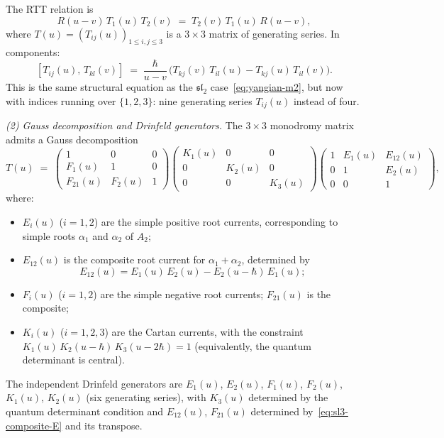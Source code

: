 \begin{example}
The RTT relation is
\begin{equation}\label{eq:sl3-rtt}
R(u{-}v)\,T_1(u)\,T_2(v)
\;=\;
T_2(v)\,T_1(u)\,R(u{-}v),
\end{equation}
where $T(u) = (T_{ij}(u))_{1\le i,j\le 3}$ is a $3\times 3$
matrix of generating series. In components:
\begin{equation}\label{eq:sl3-rtt-components}
[T_{ij}(u),\,T_{kl}(v)]
\;=\;
\frac{\hbar}{u{-}v}\,
\bigl(T_{kj}(v)\,T_{il}(u) - T_{kj}(u)\,T_{il}(v)\bigr).
\end{equation}
This is the same structural equation as the $\mathfrak{sl}_2$
case~\eqref{eq:yangian-m2}, but now with indices running
over $\{1,2,3\}$: nine generating series $T_{ij}(u)$
instead of four.

\medskip
\noindent\emph{(2) Gauss decomposition and Drinfeld generators.}
The $3\times 3$ monodromy matrix admits a Gauss decomposition
\begin{equation}\label{eq:sl3-gauss}
T(u)
\;=\;
\begin{pmatrix}
1 & 0 & 0 \\
F_1(u) & 1 & 0 \\
F_{21}(u) & F_2(u) & 1
\end{pmatrix}
\begin{pmatrix}
K_1(u) & 0 & 0 \\
0 & K_2(u) & 0 \\
0 & 0 & K_3(u)
\end{pmatrix}
\begin{pmatrix}
1 & E_1(u) & E_{12}(u) \\
0 & 1 & E_2(u) \\
0 & 0 & 1
\end{pmatrix},
\end{equation}
where:
\begin{itemize}[nosep]
\item $E_i(u)$ ($i=1,2$) are the simple positive root
 currents, corresponding to simple roots $\alpha_1$ and
 $\alpha_2$ of $A_2$;
\item $E_{12}(u)$ is the composite root current for
 $\alpha_1+\alpha_2$, determined by
 \begin{equation}\label{eq:sl3-composite-E}
 E_{12}(u) = E_1(u)\,E_2(u) - E_2(u{-}\hbar)\,E_1(u);
 \end{equation}
\item $F_i(u)$ ($i=1,2$) are the simple negative root
 currents; $F_{21}(u)$ is the composite;
\item $K_i(u)$ ($i=1,2,3$) are the Cartan currents, with
 the constraint $K_1(u)\,K_2(u-\hbar)\,K_3(u-2\hbar) = 1$ (equivalently,
 the quantum determinant is central).
\end{itemize}
The independent Drinfeld generators are
$E_1(u)$, $E_2(u)$, $F_1(u)$, $F_2(u)$, $K_1(u)$,
$K_2(u)$ (six generating series), with $K_3(u)$
determined by the quantum determinant condition and
$E_{12}(u)$, $F_{21}(u)$ determined
by~\eqref{eq:sl3-composite-E} and its transpose.


\end{example}
